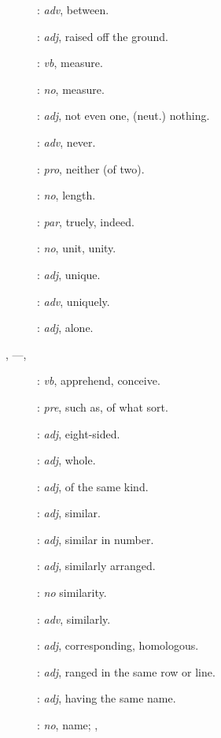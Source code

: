 {\begin{description}
\item[]: {\em adv}, between.
\item[]: {\em adj}, raised off the ground.
\item[]: {\em vb}, measure.
\item[]: {\em no}, measure.
\item[]: {\em adj}, not even one, (neut.) nothing.
\item[]: {\em adv}, never.
\item[]: {\em pro}, neither (of two).
\item[]: {\em no}, length.
\item[]: {\em par}, truely, indeed.
\item[]: {\em no}, unit, unity.
\item[]: {\em adj}, unique.
\item[]: {\em adv}, uniquely.
\item[]: {\em adj}, alone.
\item[, ---, ]: {\em vb}, apprehend, conceive.
\item[]: {\em pre}, such as, of what sort.
\item[]: {\em adj}, eight-sided.
\item[]: {\em adj}, whole.
\item[]: {\em adj}, of the same kind.
\item[]: {\em adj}, similar.
\item[]: {\em adj}, similar in number.
\item[]: {\em adj}, similarly arranged.
\item[]: {\em no} similarity.
\item[]: {\em adv}, similarly.
\item[]: {\em adj}, corresponding, homologous.
\item[]: {\em adj}, ranged in the same row or line.
\item[]: {\em adj}, having the same name.
\item[]: {\em no}, name; ,

\end{description}}
